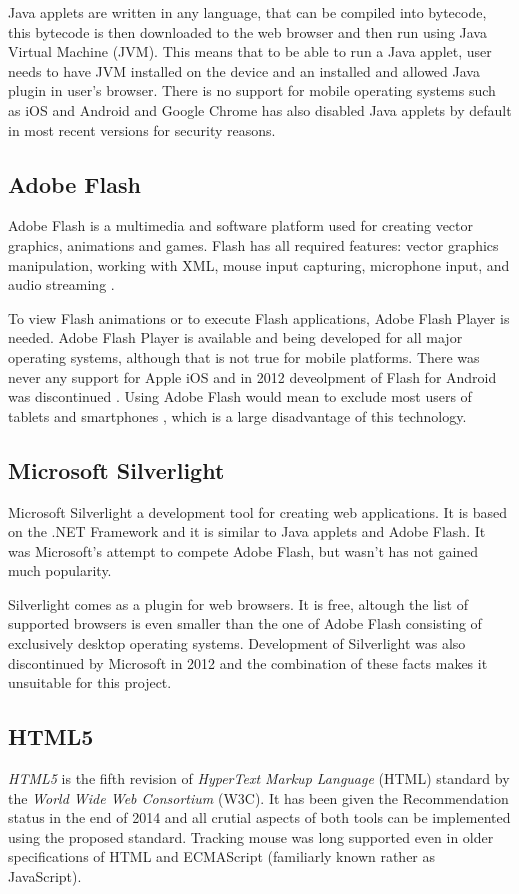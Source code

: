 Java applets are written in any language, that can be compiled into bytecode, this bytecode is then downloaded to the web browser and then run using Java Virtual Machine (JVM). This means that to be able to run a Java applet, user needs to have JVM installed on the device and an installed and allowed Java plugin in user's browser. There is no support for mobile operating systems such as iOS and Android \cite{} and Google Chrome has also disabled Java applets by default in most recent versions for security reasons.

\subsection{Adobe Flash}
Adobe Flash is a multimedia and software platform used for creating vector graphics, animations and games. Flash has all required features: vector graphics manipulation, working with XML, mouse input capturing, microphone input, and audio streaming \cite{}. 

To view Flash animations or to execute Flash applications, Adobe Flash Player is needed. Adobe Flash Player is available and being developed for all major operating systems, although that is not true for mobile platforms. There was never any support for Apple iOS \cite{} and in 2012 deveolpment of Flash for Android was discontinued \cite{}. Using Adobe Flash would mean to exclude most users of tablets and smartphones \cite{}, which is a large disadvantage of this technology.

\subsection{Microsoft Silverlight}
Microsoft Silverlight \cite{} a development tool for creating web applications. It is based on the .NET Framework and it is similar to Java applets and Adobe Flash. It was Microsoft's attempt to compete Adobe Flash, but wasn't has not gained much popularity.

Silverlight comes as a plugin for web browsers. It is free, altough the list of supported browsers is even smaller \cite{} than the one of Adobe Flash consisting of exclusively desktop operating systems. Development of Silverlight was also discontinued by Microsoft in 2012 and the combination of these facts makes it unsuitable for this project.



\subsection{HTML5}
\textit{HTML5} is the fifth revision of \textit{HyperText Markup Language} (HTML) standard by the \textit{World Wide Web Consortium} (W3C). It has been given the Recommendation status in the end of 2014 and all crutial aspects of both tools can be implemented using the proposed standard. Tracking mouse was long supported even in older specifications of HTML and ECMAScript (familiarly known rather as JavaScript).

